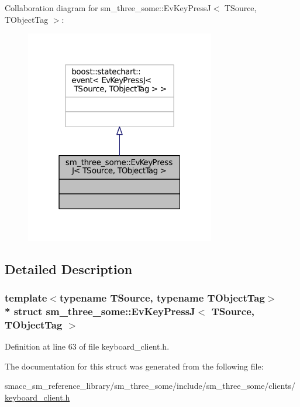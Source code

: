 Collaboration diagram for sm\+\_\+three\+\_\+some\+:\+:Ev\+Key\+PressJ$<$ T\+Source, T\+Object\+Tag $>$\+:
\nopagebreak
\begin{figure}[H]
\begin{center}
\leavevmode
\includegraphics[width=235pt]{structsm__three__some_1_1EvKeyPressJ__coll__graph}
\end{center}
\end{figure}


\subsection{Detailed Description}
\subsubsection*{template$<$typename T\+Source, typename T\+Object\+Tag$>$\\*
struct sm\+\_\+three\+\_\+some\+::\+Ev\+Key\+Press\+J$<$ T\+Source, T\+Object\+Tag $>$}



Definition at line 63 of file keyboard\+\_\+client.\+h.



The documentation for this struct was generated from the following file\+:\begin{DoxyCompactItemize}
\item 
smacc\+\_\+sm\+\_\+reference\+\_\+library/sm\+\_\+three\+\_\+some/include/sm\+\_\+three\+\_\+some/clients/\hyperlink{keyboard__client_8h}{keyboard\+\_\+client.\+h}\end{DoxyCompactItemize}

